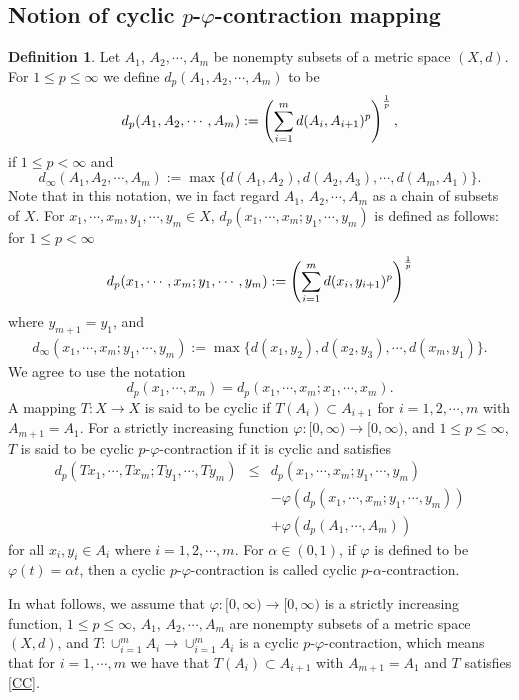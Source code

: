 \documentclass{amsart}
\theoremstyle{definition}
\newtheorem{definition}[theorem]{Definition}
\theoremstyle{remark}
\begin{document}
\subsection{Notion of cyclic $p$-$\varphi$-contraction mapping}
\begin{definition}
Let $A_1$, $A_2,\cdots, A_m$ be nonempty subsets of a metric space $(X,d)$. For $1\leq p\leq\infty$ we define $d_p(A_1,A_2,\cdots,A_m)$ to be $$d_p(A_1,A_2,\cdots,A_m):=\left(\sum_{i=1}^md(A_i,A_{i+1})^p\right)^{1\over p},$$ if $1\leq p<\infty$ and $$d_\infty(A_1,A_2,\cdots,A_m):=\max\{d(A_1,A_2),d(A_2,A_3),\cdots,d(A_m,A_1)\}.$$ Note that in this notation, we in fact regard $A_1$, $A_2,\cdots, A_m$ as a chain of subsets of $X$. For $x_1,\cdots,x_m,y_1,\cdots,y_m\in X$, $d_p(x_1,\cdots,x_m;y_1,\cdots,y_m)$ is defined as follows:
for $1\leq p<\infty$
\begin{eqnarray*}
d_p(x_1,\cdots,x_m;y_1,\cdots,y_m):=\left(\sum_{i=1}^md(x_i,y_{i+1})^p\right)^{1\over p}
\end{eqnarray*}
where $y_{m+1}=y_1$, and
\begin{eqnarray*}
d_\infty(x_1,\cdots,x_m;y_1,\cdots,y_m):=\max\{d(x_1,y_2),d(x_2,y_3),\cdots,d(x_m,y_1)\}.
\end{eqnarray*}
We agree to use the notation $$d_p(x_1,\cdots,x_m)=d_p(x_1,\cdots,x_m;x_1,\cdots,x_m).$$
A mapping $T:X\to X$ is said to be cyclic if $T(A_i)\subset A_{i+1}$ for $i=1,2,\cdots,m$ with $A_{m+1}=A_1$. For a strictly increasing function  $\varphi:[0,\infty)\to[0,\infty)$, and  $1\leq p\leq\infty$, $T$ is said to be cyclic $p$-$\varphi$-contraction if it is cyclic and satisfies
\begin{eqnarray}\label{CC}
d_p(Tx_1,\cdots,Tx_m;Ty_1,\cdots,Ty_m)&\leq& d_p(x_1,\cdots,x_m;y_1,\cdots,y_m)\nonumber\\&&-\varphi(d_p(x_1,\cdots,x_m;y_1,\cdots,y_m))\nonumber\\&&+\varphi(d_p(A_1,\cdots,A_m))
\end{eqnarray}
 for all $x_i,y_i\in A_i$ where $i=1,2,\cdots,m$. For $\alpha\in(0,1)$, if $\varphi$ is defined to be $\varphi(t)=\alpha t$, then a cyclic $p$-$\varphi$-contraction is called cyclic $p$-$\alpha$-contraction.
\end{definition}
In what follows, we assume that $\varphi:[0,\infty)\to[0,\infty)$ is a strictly increasing function, $1\leq p\leq\infty$, $A_1$, $A_2,\cdots, A_m$ are nonempty subsets of a metric space $(X,d)$, and $T:\cup_{i=1}^mA_i\to\cup_{i=1}^mA_i$ is a cyclic $p$-$\varphi$-contraction, which means that for $i=1,\cdots,m$ we have that $T(A_i)\subset A_{i+1}$ with $A_{m+1}=A_1$ and $T$ satisfies \eqref{CC}.
\end{document}
